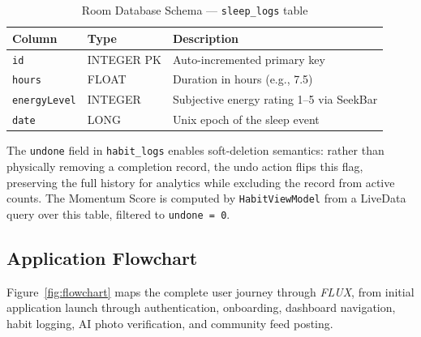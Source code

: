\documentclass[12pt,a4paper]{article}
\newcommand{\FL}{\textit{FLUX}}
\begin{document}
\begin{table}[H]
\centering
\caption{Room Database Schema --- \texttt{sleep\_logs} table}
\label{tab:schema_sleep}
\renewcommand{\arraystretch}{1.3}
\begin{tabular}{p{2.8cm} p{2.4cm} p{6.5cm}}
\toprule
\textbf{Column} & \textbf{Type} & \textbf{Description} \\
\midrule
\texttt{id}          & INTEGER PK & Auto-incremented primary key \\
\texttt{hours}       & FLOAT      & Duration in hours (e.g., 7.5) \\
\texttt{energyLevel} & INTEGER    & Subjective energy rating 1--5 via SeekBar \\
\texttt{date}        & LONG       & Unix epoch of the sleep event \\
\bottomrule
\end{tabular}
\end{table}

The \texttt{undone} field in \texttt{habit\_logs} enables soft-deletion semantics:
rather than physically removing a completion record, the undo action flips this
flag, preserving the full history for analytics while excluding the record from
active counts. The Momentum Score is computed by \texttt{HabitViewModel} from a
LiveData query over this table, filtered to \texttt{undone = 0}.

\subsection{Application Flowchart}

Figure~\ref{fig:flowchart} maps the complete user journey through \FL{}, from
initial application launch through authentication, onboarding, dashboard navigation,
habit logging, AI photo verification, and community feed posting.
\end{document}

